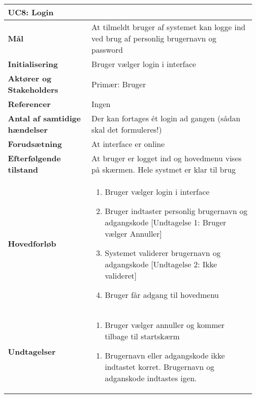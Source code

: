 \begin{table}[H] \centering
\begin{tabular}{|p{6cm}|p{8cm}|}
	\hline
\multicolumn{2}{|l|}{\textbf{UC8: Login}} \\\hline
\textbf{Mål}								
&At tilmeldt bruger af systemet kan logge ind ved brug af personlig brugernavn og password
 \\\hline
\textbf{Initialisering}					
&Bruger vælger login i interface
 \\\hline
\textbf{Aktører og Stakeholders}			
&Primær: Bruger
 \\\hline
\textbf{Referencer}						
&Ingen
 \\\hline
\textbf{Antal af samtidige hændelser}	
&Der kan fortages ét login ad gangen (sådan skal det formuleres!)
 \\\hline
\textbf{Forudsætning}					
&At interface er online
 \\\hline
\textbf{Efterfølgende tilstand}			
&At bruger er logget ind og hovedmenu vises på skærmen. Hele systmet er klar til brug
 \\\hline
\textbf{Hovedforløb}						
& 
\begin{enumerate}

\item Bruger vælger login i interface

\item \label{UC8und1}Bruger indtaster personlig brugernavn og adgangskode [Undtagelse 1: Bruger vælger Annuller]

\item \label{UC8und2} Systemet validerer brugernavn og adgangskode [Undtagelse 2: Ikke valideret]

\item Bruger får adgang til hovedmenu
 
\end{enumerate}
\\\hline

\textbf{Undtagelser}						
&\begin{enumerate}[label= \ref{UC8und1}a.]
			\item Bruger vælger annuller og kommer tilbage til startskærm
		\end{enumerate}
											
		\begin{enumerate}[label= \ref{UC8und2}a.]
			\item Brugernavn eller adgangskode ikke indtastet korret. Brugernavn og adganskode indtastes igen.
		\end{enumerate} \\\hline


	\end{tabular}
	\label{UC8} 
\end{table}